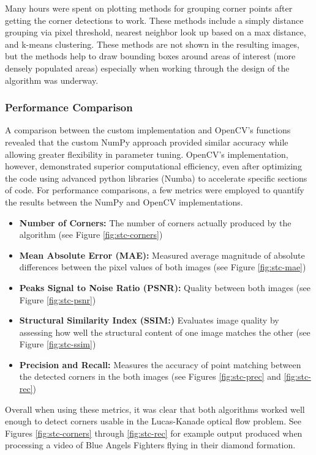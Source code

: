 \documentclass[11pt, conference, letterpaper]{IEEEtran}
\begin{document}
Many hours were spent on plotting methods for grouping corner points after getting the corner detections to work. These methods include a simply distance grouping via pixel threshold, nearest neighbor look up based on a max distance, and k-means clustering. These methods are not shown in the resulting images, but the methods help to draw bounding boxes around areas of interest (more densely populated areas) especially when working through the design of the algorithm was underway.
\bigskip

\subsubsection{Performance Comparison}
A comparison between the custom implementation and OpenCV's functions revealed that the custom NumPy approach provided similar accuracy while allowing greater flexibility in parameter tuning. OpenCV's implementation, however, demonstrated superior computational efficiency, even after optimizing the code using advanced python libraries (Numba) to accelerate specific sections of code. For performance comparisons, a few metrics were employed to quantify the results between the NumPy and OpenCV implementations.

\begin{itemize}
    \item \textbf{Number of Corners:} The number of corners actually produced by the algorithm (see Figure \ref{fig:stc-corners})
    \item \textbf{Mean Absolute Error (MAE):} Measured average magnitude of absolute differences between the pixel values of both images (see Figure \ref{fig:stc-mae})
    \item \textbf{Peaks Signal to Noise Ratio (PSNR):} Quality between both images (see Figure \ref{fig:stc-psnr})
    \item \textbf{Structural Similarity Index (SSIM:)} Evaluates image quality by assessing how well the structural content of one image matches the other (see Figure \ref{fig:stc-ssim})
    \item \textbf{Precision and Recall:} Measures the accuracy of point matching between the detected corners in the both images (see Figures \ref{fig:stc-prec} and \ref{fig:stc-rec})
\end{itemize}

Overall when using these metrics, it was clear that both algorithms worked well enough to detect corners usable in the Lucas-Kanade optical flow problem. See Figures \ref{fig:stc-corners} through \ref{fig:stc-rec} for example output produced when processing a video of Blue Angels Fighters flying in their diamond formation.
\end{document}
